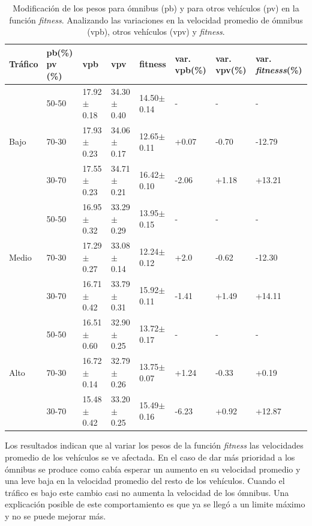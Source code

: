 \begin{table}[H]
	\renewcommand{\arraystretch}{1.2}
	\caption{Modificación de los pesos para ómnibus (pb) y para otros vehículos (pv) en la función \emph{fitness}. Analizando las variaciones en la velocidad promedio de ómnibus (vpb),  otros vehículos (vpv) y \emph{fitness}. }
	\label{table:analisis_fitness}
	\centering
	\begin{tabular}{p{1cm}p{1.2cm}p{1.8cm}p{1.8cm}p{1.8cm}p{1.2cm}p{1.2cm}p{1.2cm} }
		\hline
		Tráfico &
		pb(\%) pv (\%)& 
		vpb & 
		vpv &
		fitness &
		var. \newline vpb(\%) &
		var. \newline vpv(\%) &
		var. \newline \emph{fitnesss}(\%)
		\\ 
		\hline
		& 50-50  & 17.92$\pm$0.18 & 34.30$\pm$0.40 & 14.50$\pm$0.14  &- & - & -\\		
		Bajo & 70-30  & 17.93$\pm$0.23 & 34.06$\pm$0.17 & 12.65$\pm$0.11  & +0.07 & -0.70 & -12.79\\		
		& 30-70 & 17.55$\pm$0.23 & 34.71$\pm$0.21 & 16.42$\pm$0.10  & -2.06 & +1.18 & +13.21\\
		\hline
		
		& 50-50  & 16.95$\pm$0.32 & 33.29$\pm$0.29 & 13.95$\pm$0.15  &- & - & -\\		
		Medio & 70-30  & 17.29$\pm$0.27 & 33.08$\pm$0.14 & 12.24$\pm$0.12  & +2.0 & -0.62 & -12.30\\		
		& 30-70 & 16.71$\pm$0.42 & 33.79$\pm$0.31 & 15.92$\pm$0.11  & -1.41 & +1.49& +14.11\\
		
		\hline
		& 50-50  & 16.51$\pm$0.60 & 32.90$\pm$0.25 & 13.72$\pm$0.17  &- & - & -\\		
		Alto & 70-30  & 16.72$\pm$0.14 & 32.79$\pm$0.26 & 13.75$\pm$0.07  & +1.24 & -0.33 & +0.19\\	
		& 30-70 & 15.48$\pm$0.42 & 33.20$\pm$0.25 & 15.49$\pm$0.16  & -6.23 & +0.92 & +12.87\\
		\hline
	\end{tabular}
\end{table}


Los resultados indican que al variar los pesos de la función \emph{fitness} las velocidades promedio de los vehículos se ve afectada. En el caso de dar más prioridad a los ómnibus se produce como cabía esperar un aumento en su velocidad promedio y una leve baja en la velocidad promedio del resto de los vehículos. Cuando el tráfico es bajo este cambio casi no aumenta la velocidad de los ómnibus. Una explicación posible de este comportamiento es que ya se llegó a un limite máximo y no se puede mejorar más.

